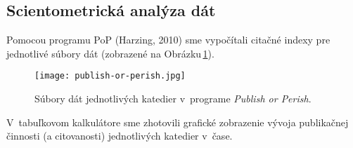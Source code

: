\subsection{Scientometrická analýza dát}

Pomocou programu PoP (Harzing, 2010) sme vypočítali citačné indexy pre
jednotlivé súbory dát (zobrazené na Obrázku\,\ref{fig:pop.departmentfiles}).

\begin{figure}
  \centering
  \texttt{[image: publish-or-perish.jpg]}
  \caption{Súbory dát jednotlivých katedier v~programe \emph{Publish or
      Perish}.}
  \label{fig:pop.departmentfiles}
\end{figure}

V~tabuľkovom kalkulátore sme zhotovili grafické zobrazenie vývoja publikačnej
činnosti (a citovanosti) jednotlivých katedier v~čase.

